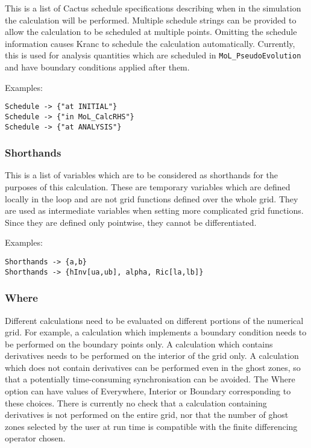 \documentclass{report}
\begin{document}
This is a list of Cactus schedule specifications describing when in
the simulation the calculation will be performed.  Multiple schedule
strings can be provided to allow the calculation to be scheduled at
multiple points.  Omitting the schedule information causes Kranc to
schedule the calculation automatically.  Currently, this is used for
analysis quantities which are scheduled in \verb|MoL_PseudoEvolution|
and have boundary conditions applied after them.

Examples:

\begin{center}
\begin{minipage}{0.8 \textwidth}
\begin{verbatim}
Schedule -> {"at INITIAL"}
Schedule -> {"in MoL_CalcRHS"}
Schedule -> {"at ANALYSIS"}
\end{verbatim}
\end{minipage}
\end{center}

\subsubsection{Shorthands}

This is a list of variables which are to be considered as shorthands
for the purposes of this calculation.  These are temporary variables
which are defined locally in the loop and are not grid functions
defined over the whole grid.  They are used as intermediate variables
when setting more complicated grid functions.  Since they are defined
only pointwise, they cannot be differentiated.

Examples:

\begin{center}
\begin{minipage}{0.8 \textwidth}
\begin{verbatim}
Shorthands -> {a,b}
Shorthands -> {hInv[ua,ub], alpha, Ric[la,lb]}
\end{verbatim}
\end{minipage}
\end{center}

\subsubsection{Where}

Different calculations need to be evaluated on different portions of
the numerical grid.  For example, a calculation which implements a
boundary condition needs to be performed on the boundary points only.
A calculation which contains derivatives needs to be performed on the
interior of the grid only.  A calculation which does not contain
derivatives can be performed even in the ghost zones, so that a
potentially time-consuming synchronisation can be avoided.  The Where
option can have values of Everywhere, Interior or Boundary
corresponding to these choices.  There is currently no check that a
calculation containing derivatives is not performed on the entire
grid, nor that the number of ghost zones selected by the user at run
time is compatible with the finite differencing operator chosen.
\end{document}

